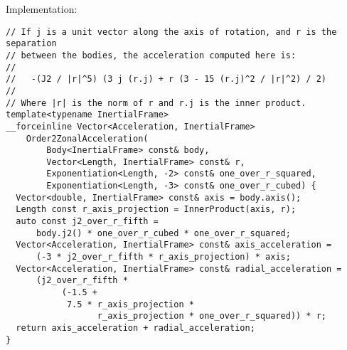 \documentclass[10pt, a4paper, oneside]{basestyle}
\begin{document}
\noindent
Implementation:
{\small%
\begin{verbatim}
// If j is a unit vector along the axis of rotation, and r is the separation
// between the bodies, the acceleration computed here is:
//
//   -(J2 / |r|^5) (3 j (r.j) + r (3 - 15 (r.j)^2 / |r|^2) / 2)
//
// Where |r| is the norm of r and r.j is the inner product.
template<typename InertialFrame>
__forceinline Vector<Acceleration, InertialFrame>
    Order2ZonalAcceleration(
        Body<InertialFrame> const& body,
        Vector<Length, InertialFrame> const& r,
        Exponentiation<Length, -2> const& one_over_r_squared,
        Exponentiation<Length, -3> const& one_over_r_cubed) {
  Vector<double, InertialFrame> const& axis = body.axis();
  Length const r_axis_projection = InnerProduct(axis, r);
  auto const j2_over_r_fifth =
      body.j2() * one_over_r_cubed * one_over_r_squared;
  Vector<Acceleration, InertialFrame> const& axis_acceleration =
      (-3 * j2_over_r_fifth * r_axis_projection) * axis;
  Vector<Acceleration, InertialFrame> const& radial_acceleration =
      (j2_over_r_fifth *
           (-1.5 +
            7.5 * r_axis_projection *
                  r_axis_projection * one_over_r_squared)) * r;
  return axis_acceleration + radial_acceleration;
}
\end{verbatim}%
}
\end{document}
